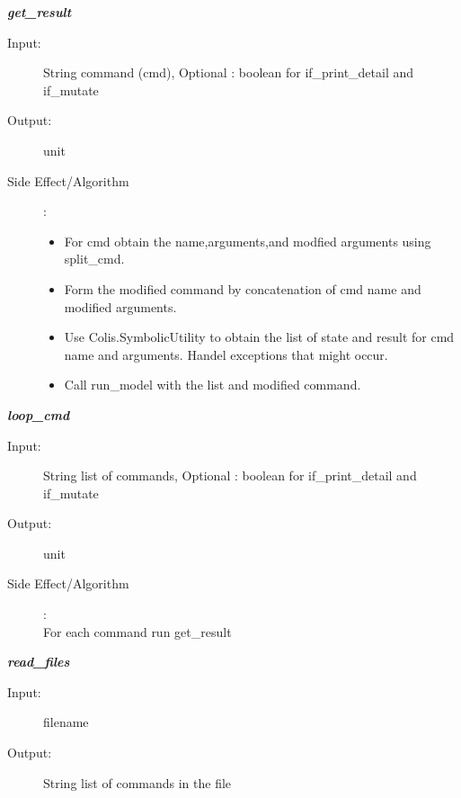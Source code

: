 \documentclass[12pt]{article}
\begin{document}
\begin{description}
\item \textbf{\textit{get\_result}}
\begin{description}
    \item[Input:] String command (cmd), Optional : boolean for if\_print\_detail and if\_mutate
    \item[Output:] unit
    \item[Side Effect/Algorithm]:
    \begin{itemize}
        \item For cmd obtain the name,arguments,and modfied arguments using split\_cmd.
        \item Form the modified command by concatenation of cmd name and modified arguments.
        \item  Use Colis.SymbolicUtility to obtain the list of state and result for cmd name and arguments. Handel exceptions that might occur.
        \item  Call run\_model with the list and modified command.
    \end{itemize} 
\end{description}

\item \textbf{\textit{loop\_cmd}}
\begin{description}
    \item[Input:] String list of commands, Optional : boolean for if\_print\_detail and if\_mutate
    \item[Output:] unit
    \item[Side Effect/Algorithm]:\\ For each command run get\_result
\end{description}

\item \textbf{\textit{read\_files}}
\begin{description}
    \item[Input:] filename
    \item[Output:]  String list of commands in the file
\end{description}


\end{description}
\end{document}
